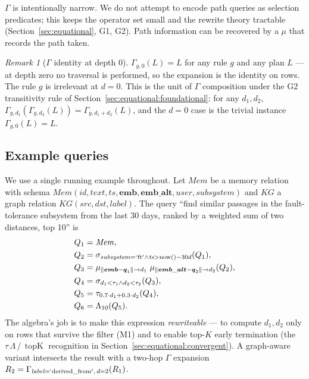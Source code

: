 \documentclass[acmsmall,review,anonymous]{acmart}
\theoremstyle{plain}
\theoremstyle{definition}
\newcommand{\vect}[1]{\boldsymbol{#1}}
\newcommand{\Mem}{\mathit{Mem}}
\newcommand{\KG}{\mathit{KG}}
\newcommand{\topK}{\operatorname{topK}}
\theoremstyle{remark}
\newtheorem{remark}{Remark}
\begin{document}
$\Gamma$ is intentionally narrow. We do not attempt to encode path
queries as selection predicates; this keeps the operator set small
and the rewrite theory tractable (Section~\ref{sec:equational}, G1,
G2). Path information can be recovered by a $\mu$ that records the path
taken.

\begin{remark}[$\Gamma$ identity at depth $0$]\label{rem:gamma-id}
$\Gamma_{g,0}(L) = L$ for any rule $g$ and any plan $L$ --- at
depth zero no traversal is performed, so the expansion is the
identity on rows. The rule $g$ is irrelevant at $d=0$. This is the
unit of $\Gamma$ composition under the G2 transitivity rule of
Section~\ref{sec:equational:foundational}: for any $d_1, d_2$,
$\Gamma_{g,d_1}(\Gamma_{g,d_2}(L)) = \Gamma_{g,d_1+d_2}(L)$, and
the $d=0$ case is the trivial instance $\Gamma_{g,0}(L) = L$.
\end{remark}

\subsection{Example queries}\label{sec:example}

We use a single running example throughout. Let $\Mem$ be a memory
relation with schema
$\Mem(\mathit{id}, \mathit{text}, \mathit{ts}, \vect{emb}, \vect{emb\_alt},
\mathit{user}, \mathit{subsystem})$ and $\KG$ a graph relation
$\KG(\mathit{src}, \mathit{dst}, \mathit{label})$. The query ``find
similar passages in the fault-tolerance subsystem from the last 30
days, ranked by a weighted sum of two distances, top 10'' is
\begin{align*}
Q_1 &= \Mem, \\
Q_2 &= \sigma_{\mathit{subsystem} = \mathrm{`ft'} \wedge \mathit{ts} > \mathrm{now}() - 30d}(Q_1), \\
Q_3 &= \mu_{\lVert\vect{emb} - \vect{q}_1\rVert \to d_1}\;
        \mu_{\lVert\vect{emb\_alt} - \vect{q}_2\rVert \to d_2}(Q_2), \\
Q_4 &= \sigma_{d_1 < \tau_1 \wedge d_2 < \tau_2}(Q_3), \\
Q_5 &= \tau_{0.7\cdot d_1 + 0.3\cdot d_2}(Q_4), \\
Q_6 &= \Lambda_{10}(Q_5).
\end{align*}
The algebra's job is to make this expression \emph{rewriteable}
--- to compute $d_1, d_2$ only on rows that survive the filter
(M1) and to enable top-$K$ early termination (the
$\tau\,\Lambda\,/\,\topK$ recognition in
Section~\ref{sec:equational:convergent}). A graph-aware
variant intersects the result with a two-hop $\Gamma$ expansion
$R_2 = \Gamma_{\mathit{label}=\mathrm{`derived\_from'},\, d=2}(R_1)$.
\end{document}
